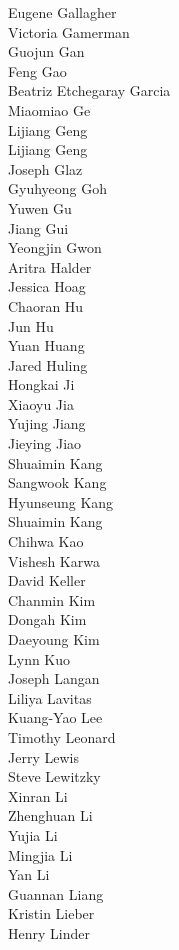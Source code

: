Eugene Gallagher\\
Victoria Gamerman\\
Guojun  Gan\\
Feng Gao\\
Beatriz Etchegaray Garcia\\
Miaomiao Ge\\
Lijiang Geng\\
Lijiang Geng\\
Joseph Glaz\\
Gyuhyeong Goh\\
Yuwen Gu\\
Jiang Gui\\
Yeongjin Gwon\\
Aritra Halder\\
Jessica Hoag\\
Chaoran Hu\\
Jun Hu\\
Yuan Huang\\
Jared Huling\\
Hongkai Ji\\
Xiaoyu Jia\\
Yujing Jiang\\
Jieying Jiao\\
Shuaimin Kang\\
Sangwook Kang\\
Hyunseung Kang\\
Shuaimin Kang\\
Chihwa Kao\\
Vishesh Karwa\\
David Keller\\
Chanmin Kim\\
Dongah Kim\\
Daeyoung Kim\\
Lynn Kuo\\
Joseph Langan\\
Liliya Lavitas\\
Kuang-Yao Lee\\
Timothy Leonard\\
Jerry Lewis\\
Steve Lewitzky\\
Xinran Li\\
Zhenghuan Li\\
Yujia Li\\
Mingjia Li\\
Yan Li\\
Guannan Liang\\
Kristin Lieber\\
Henry Linder\\
